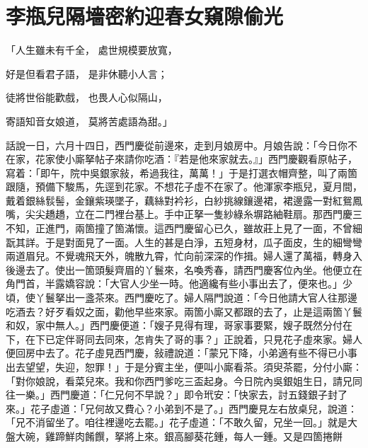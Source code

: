 %

\chapter{李瓶兒隔墻密約\KG 迎春女窺隙偷光}

「人生雖未有千全，  處世規模要放寬，

好是但看君子語，  是非休聽小人言；

徒將世俗能歡戲，  也畏人心似隔山，

寄語知音女娘道，  莫將苦處語為甜。」

話說一日，六月十四日，西門慶從前邊來，走到月娘房中。月娘告說：「今日你不在家，花家使小廝拏帖子來請你吃酒：『若是他來家就去。』」西門慶觀看原帖子，寫着：「即午，院中吳銀家敍，希過我往，萬萬！」于是打選衣帽齊整，叫了兩箇跟隨，預備下駿馬，先逕到花家。不想花子虛不在家了。他渾家李瓶兒，夏月間，戴着銀絲䯼髻，金鑲紫瑛墜子，藕絲對衿衫，白紗挑線鑲邊裙，裙邊露一對紅鴛鳳嘴，尖尖趫趫，立在二門裡台基上。手中正拏一隻紗綠糸塀路紬鞋扇。那西門慶三不知，正進門，兩箇撞了箇滿懷。這西門慶留心已久，雖故莊上見了一面，不曾細翫其詳。于是對面見了一面。人生的甚是白淨，五短身材，瓜子面皮，生的細彎彎兩道眉兒。不覺魂飛天外，魄散九霄，忙向前深深的作揖。婦人還了萬福，轉身入後邊去了。使出一箇頭髮齊眉的丫鬟來，名喚秀春，請西門慶客位內坐。他便立在角門首，半露嬌容說：「大官人少坐一時。他適纔有些小事出去了，便來也。」少頃，使丫鬟拏出一盞茶來。西門慶吃了。婦人隔門說道：「今日他請大官人往那邊吃酒去？好歹看奴之面，勸他早些來家。兩箇小廝又都跟的去了，止是這兩箇丫鬟和奴，家中無人。」西門慶便道：「嫂子見得有理，哥家事要緊，嫂子既然分付在下，在下已定伴哥同去同來，怎肯失了哥的事？」正說着，只見花子虛來家。婦人便回房中去了。花子虛見西門慶，敍禮說道：「蒙兄下降，小弟適有些不得已小事出去望望，失迎，恕罪！」于是分賓主坐，便叫小廝看茶。須臾茶罷，分付小廝：「對你娘說，看菜兒來。我和你西門爹吃三盃起身。今日院內吳銀姐生日，請兄同往一樂。」西門慶道：「仁兄何不早說？」即令玳安：「快家去，討五錢銀子封了來。」花子虛道：「兄何故又費心？小弟到不是了。」西門慶見左右放桌兒，說道：「兄不消留坐了。咱往裡邊吃去罷。」花子虛道：「不敢久留，兄坐一回。」就是大盤大碗，雞蹄鮮肉餚饌，拏將上來。銀高腳葵花鍾，每人一鍾。又是四箇捲餅 